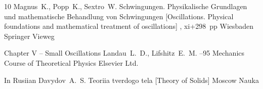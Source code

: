 \begin{thebibliography}{10}
\by Magnus~K., Popp~K.,  Sextro~W.
\book     Schwingungen. Physikalische Grundlagen und mathe\-ma\-tische Behandlung von Schwingungen \rm [Oscillations. Physical foundations and mathematical treatment of oscillations]
,
xi+298~pp
\publaddr Wiesbaden
\publ Springer Vieweg 


\paper Chapter V – Small Oscillations
\by     Landau~L.~D., Lifshitz~E.~M.
–95
\volinfo Mechanics
\inbook Course  of  Theoretical  Physics 
\publ  Elsevier  Ltd.
 



\lang In Rusiian
\by Davydov~A.~S.
\book Teoriia tverdogo tela \rm [Theory of Solids]
\publaddr Moscow
\publ  Nauka


\end{thebibliography}

\EngDate

\newpage
\Russian

%
